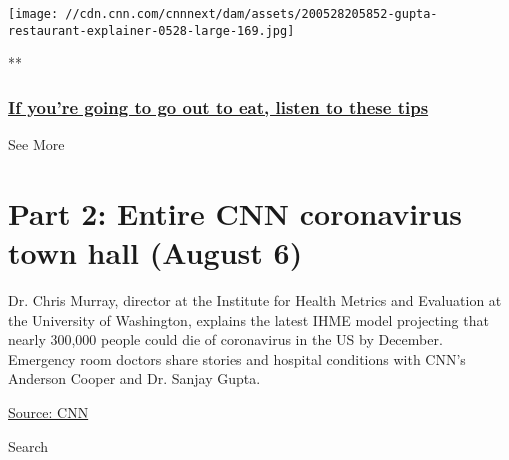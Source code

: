 \href{/videos/health/2020/05/29/gupta-dining-out-restaurant-explainer-coronavirus-town-hall-vpx.cnn/video/playlists/cnn-coronavirus-town-hall/}{}

\texttt{[image: //cdn.cnn.com/cnnnext/dam/assets/200528205852-gupta-restaurant-explainer-0528-large-169.jpg]}

**

\hypertarget{if-youre-going-to-go-out-to-eat-listen-to-these-tips}{%
\subsubsection{\texorpdfstring{\href{/videos/health/2020/05/29/gupta-dining-out-restaurant-explainer-coronavirus-town-hall-vpx.cnn/video/playlists/cnn-coronavirus-town-hall/}{If
you're going to go out to eat, listen to these
tips}}{If you're going to go out to eat, listen to these tips}}\label{if-youre-going-to-go-out-to-eat-listen-to-these-tips}}

See More

\hypertarget{part-2-entire-cnn-coronavirus-town-hall-august-6-2}{%
\section{Part 2: Entire CNN coronavirus town hall (August
6)}\label{part-2-entire-cnn-coronavirus-town-hall-august-6-2}}

Dr. Chris Murray, director at the Institute for Health Metrics and
Evaluation at the University of Washington, explains the latest IHME
model projecting that nearly 300,000 people could die of coronavirus in
the US by December. Emergency room doctors share stories and hospital
conditions with CNN's Anderson Cooper and Dr. Sanjay Gupta.

\href{https://www.cnn.com/}{Source: CNN}

Search

